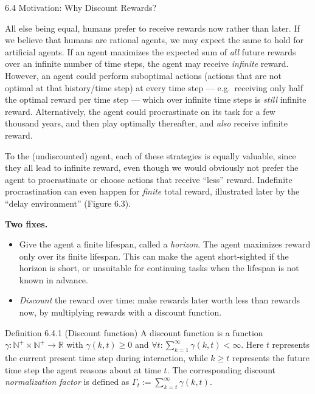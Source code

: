 \documentclass[aspectratio=169,10pt]{beamer}
\begin{document}
\begin{frame}[allowframebreaks]{6.4 Motivation: Why Discount Rewards?}

All else being equal, humans prefer to receive rewards now rather than
later. If we believe that humans are rational agents, we may expect the
same to hold for artificial agents. If an agent maximizes the expected sum
of \emph{all} future rewards over an infinite number of time steps, the
agent may receive \emph{infinite} reward. However, an agent could perform
suboptimal actions (actions that are not optimal at that history/time step)
at every time step --- e.g.\ receiving only half the optimal reward per
time step --- which over infinite time steps is \emph{still} infinite
reward. Alternatively, the agent could procrastinate on its task for a few
thousand years, and then play optimally thereafter, and \emph{also} receive
infinite reward.

\vspace{0.2cm}
To the (undiscounted) agent, each of these strategies is equally valuable,
since they all lead to infinite reward, even though we would obviously not
prefer the agent to procrastinate or choose actions that receive
``less'' reward. Indefinite procrastination can even happen for
\emph{finite} total reward, illustrated later by the ``delay environment''
(Figure 6.3).

\vspace{0.2cm}
\textbf{Two fixes.}
\begin{itemize}
  \item Give the agent a finite lifespan, called a \emph{horizon}. The
    agent maximizes reward only over its finite lifespan. This can make
    the agent short-sighted if the horizon is short, or unsuitable for
    continuing tasks when the lifespan is not known in advance.
  \item \emph{Discount} the reward over time: make rewards later worth
    less than rewards now, by multiplying rewards with a discount
    function.
\end{itemize}

\framebreak

\begin{block}{Definition 6.4.1 (Discount function)}
A discount function is a function $\gamma: \mathbb{N}^+ \times
\mathbb{N}^+ \to \mathbb{R}$ with $\gamma(k,t) \ge 0$ and
$\forall t: \sum_{k=1}^{\infty}\gamma(k,t) < \infty$. Here $t$ represents
the current present time step during interaction, while $k \ge t$
represents the future time step the agent reasons about at time $t$. The
corresponding discount \emph{normalization factor} is defined as
$\Gamma_t := \sum_{k=t}^{\infty}\gamma(k,t)$.
\end{block}


\end{frame}
\end{document}
